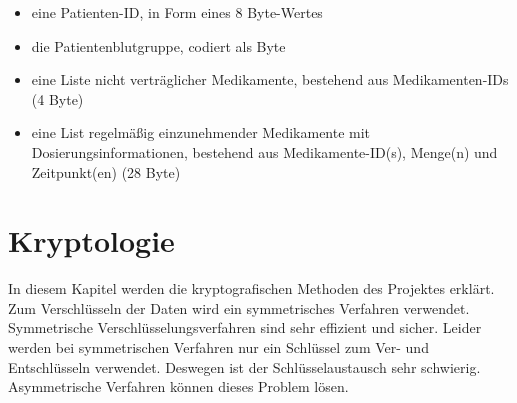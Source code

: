 \documentclass[parskip]{scrartcl}
\begin{document}
	\begin{itemize}
		\item eine Patienten-ID, in Form eines 8 Byte-Wertes
		\item die Patientenblutgruppe, codiert als Byte
		\item eine Liste nicht verträglicher Medikamente, bestehend aus Medikamenten-IDs (4 Byte)
		\item eine List regelmäßig einzunehmender Medikamente mit Dosierungsinformationen, bestehend aus Medikamente-ID(s), Menge(n) und Zeitpunkt(en) (28 Byte)
	\end{itemize}
\section{Kryptologie}
In diesem Kapitel werden die kryptografischen Methoden des Projektes erklärt. Zum Verschlüsseln der Daten wird ein symmetrisches Verfahren verwendet. Symmetrische Verschlüsselungsverfahren sind sehr effizient und sicher. Leider werden bei symmetrischen Verfahren nur ein Schlüssel zum Ver- und Entschlüsseln verwendet. Deswegen ist der Schlüsselaustausch sehr schwierig. Asymmetrische Verfahren können dieses Problem lösen.
\end{document}
